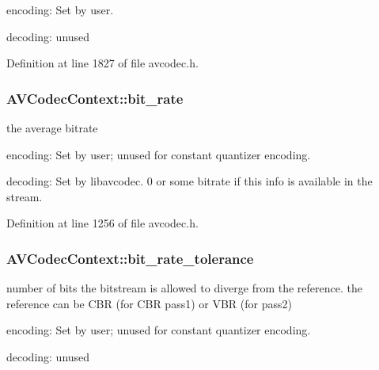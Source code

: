 \begin{DoxyItemize}
\item encoding\+: Set by user.
\item decoding\+: unused 
\end{DoxyItemize}

Definition at line 1827 of file avcodec.\+h.

\subsubsection[{\texorpdfstring{bit\+\_\+rate}{bit_rate}}]{ A\+V\+Codec\+Context\+::bit\+\_\+rate}\hypertarget{struct_a_v_codec_context_ad9214d5af3e98ea7f1d4e94be6a522de}{}\label{struct_a_v_codec_context_ad9214d5af3e98ea7f1d4e94be6a522de}
the average bitrate
\begin{DoxyItemize}
\item encoding\+: Set by user; unused for constant quantizer encoding.
\item decoding\+: Set by libavcodec. 0 or some bitrate if this info is available in the stream. 
\end{DoxyItemize}

Definition at line 1256 of file avcodec.\+h.

\subsubsection[{\texorpdfstring{bit\+\_\+rate\+\_\+tolerance}{bit_rate_tolerance}}]{ A\+V\+Codec\+Context\+::bit\+\_\+rate\+\_\+tolerance}\hypertarget{struct_a_v_codec_context_a65f37abbfc9d4630aa7fd44b9a1ebb21}{}\label{struct_a_v_codec_context_a65f37abbfc9d4630aa7fd44b9a1ebb21}
number of bits the bitstream is allowed to diverge from the reference. the reference can be C\+BR (for C\+BR pass1) or V\+BR (for pass2)
\begin{DoxyItemize}
\item encoding\+: Set by user; unused for constant quantizer encoding.
\item decoding\+: unused 
\end{DoxyItemize}


